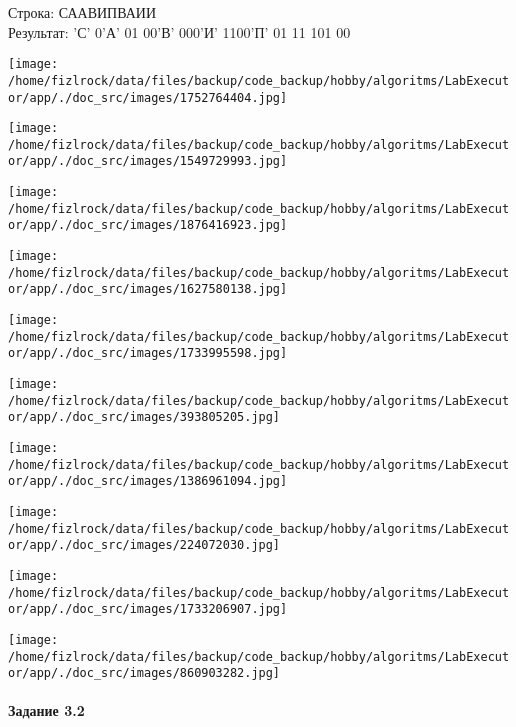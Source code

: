 \documentclass[a4paper, 12pt]{article}
\begin{document}
Строка: 
СААВИПВАИИ\\
Результат: 'С' 0'А' 01 00'В' 000'И' 1100'П' 01 11 101 00

\texttt{[image: /home/fizlrock/data/files/backup/code\_backup/hobby/algoritms/LabExecutor/app/./doc\_src/images/1752764404.jpg]}

\texttt{[image: /home/fizlrock/data/files/backup/code\_backup/hobby/algoritms/LabExecutor/app/./doc\_src/images/1549729993.jpg]}

\texttt{[image: /home/fizlrock/data/files/backup/code\_backup/hobby/algoritms/LabExecutor/app/./doc\_src/images/1876416923.jpg]}

\texttt{[image: /home/fizlrock/data/files/backup/code\_backup/hobby/algoritms/LabExecutor/app/./doc\_src/images/1627580138.jpg]}

\texttt{[image: /home/fizlrock/data/files/backup/code\_backup/hobby/algoritms/LabExecutor/app/./doc\_src/images/1733995598.jpg]}

\texttt{[image: /home/fizlrock/data/files/backup/code\_backup/hobby/algoritms/LabExecutor/app/./doc\_src/images/393805205.jpg]}

\texttt{[image: /home/fizlrock/data/files/backup/code\_backup/hobby/algoritms/LabExecutor/app/./doc\_src/images/1386961094.jpg]}

\texttt{[image: /home/fizlrock/data/files/backup/code\_backup/hobby/algoritms/LabExecutor/app/./doc\_src/images/224072030.jpg]}

\texttt{[image: /home/fizlrock/data/files/backup/code\_backup/hobby/algoritms/LabExecutor/app/./doc\_src/images/1733206907.jpg]}

\texttt{[image: /home/fizlrock/data/files/backup/code\_backup/hobby/algoritms/LabExecutor/app/./doc\_src/images/860903282.jpg]}
\pagebreak

\paragraph{Задание 3.2}
\end{document}
